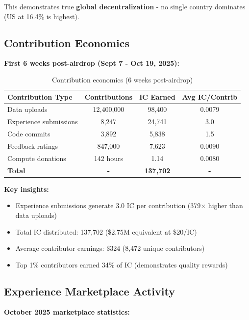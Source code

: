 This demonstrates true \textbf{global decentralization} - no single country dominates (US at 16.4\% is highest).

\subsection{Contribution Economics}

\textbf{First 6 weeks post-airdrop (Sept 7 - Oct 19, 2025):}

\begin{table}[h]
\centering
\begin{tabular}{lccc}
\toprule
\textbf{Contribution Type} & \textbf{Contributions} & \textbf{IC Earned} & \textbf{Avg IC/Contrib} \\
\midrule
Data uploads & 12,400,000 & 98,400 & 0.0079 \\
Experience submissions & 8,247 & 24,741 & 3.0 \\
Code commits & 3,892 & 5,838 & 1.5 \\
Feedback ratings & 847,000 & 7,623 & 0.0090 \\
Compute donations & 142 hours & 1.14 & 0.0080 \\
\textbf{Total} & \textbf{-} & \textbf{137,702} & \textbf{-} \\
\bottomrule
\end{tabular}
\caption{Contribution economics (6 weeks post-airdrop)}
\label{tab:contribution_econ}
\end{table}

\textbf{Key insights:}
\begin{itemize}
\item Experience submissions generate 3.0 IC per contribution (379× higher than data uploads)
\item Total IC distributed: 137,702 (\$2.75M equivalent at \$20/IC)
\item Average contributor earnings: \$324 (8,472 unique contributors)
\item Top 1\% contributors earned 34\% of IC (demonstrates quality rewards)
\end{itemize}

\subsection{Experience Marketplace Activity}

\textbf{October 2025 marketplace statistics:}


